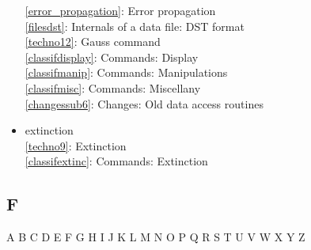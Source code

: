 \documentclass[11pt,twoside]{article}
\newcommand{\htmlref}[2]{#1}
\newcommand{\idxint}[2]{\ref{#1}: \htmlref{#2}{#1}}
\newcommand{\idxint}[2]{\htmlref{#2}{#1}}
\begin{document}
\begin{itemize}
   \idxint{error_propagation}{Error propagation}\\
   \idxint{filesdst}{Internals of a data file: DST format}\\
   \idxint{techno12}{Gauss command}\\
   \idxint{classifdisplay}{Commands: Display}\\
   \idxint{classifmanip}{Commands: Manipulations}\\
   \idxint{classifmisc}{Commands: Miscellany}\\
   \idxint{changessub6}{Changes: Old data access routines}
\item extinction\\
   \idxint{techno9}{Extinction}\\
   \idxint{classifextinc}{Commands: Extinction}
\end{itemize}

\subsection*{\label{index_F}F}

\begin{htmlonly}
\htmlref{A}{index_A}
\htmlref{B}{index_B}
\htmlref{C}{index_C}
\htmlref{D}{index_D}
\htmlref{E}{index_E}
F
\htmlref{G}{index_G}
\htmlref{H}{index_H}
\htmlref{I}{index_I}
\htmlref{J}{index_J}
\htmlref{K}{index_K}
\htmlref{L}{index_L}
\htmlref{M}{index_M}
\htmlref{N}{index_N}
\htmlref{O}{index_O}
\htmlref{P}{index_P}
\htmlref{Q}{index_Q}
\htmlref{R}{index_R}
\htmlref{S}{index_S}
\htmlref{T}{index_T}
\htmlref{U}{index_U}
\htmlref{V}{index_V}
\htmlref{W}{index_W}
\htmlref{X}{index_X}
\htmlref{Y}{index_Y}
Z
\end{htmlonly}
\end{document}
